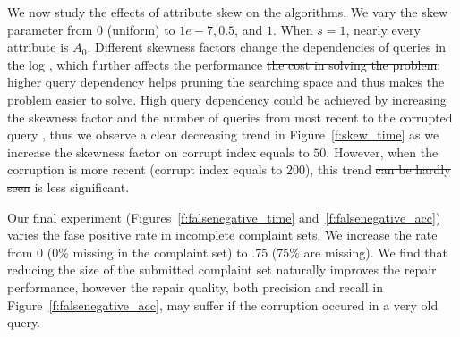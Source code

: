  We now study the effects of attribute skew on the algorithms.
We vary the skew parameter from $0$ (uniform) to $1e-7, 0.5$, and $1$. When $s=1$, nearly every attribute is $A_0$.
Different skewness factors change the dependencies of queries in the log , which further affects the performance \sout{the cost in solving the problem}: 
 higher query dependency helps pruning the searching space and thus makes the problem easier to solve. 
High query dependency could be achieved by increasing the skewness factor and the number of queries from most recent to the corrupted query , thus
we observe a clear decreasing trend in Figure~\ref{f:skew_time} as we increase the skewness factor on corrupt index equals to $50$. 
However, when the corruption is more recent (corrupt index equals to $200$), this trend \sout{can be hardly seen} is less significant.


% 
% 
% 


Our final experiment (Figures~\ref{f:falsenegative_time} and~\ref{f:falsenegative_acc}) varies the fase positive rate in incomplete complaint sets.
We increase the rate from $0$ ($0\%$ missing in the complaint set) to $.75$ ($75\%$ are missing).  
We find that reducing the size of the submitted complaint set naturally improves the repair performance,
however the repair quality, both precision and recall in Figure~\ref{f:falsenegative_acc}, may suffer if the corruption occured in a very old query.


